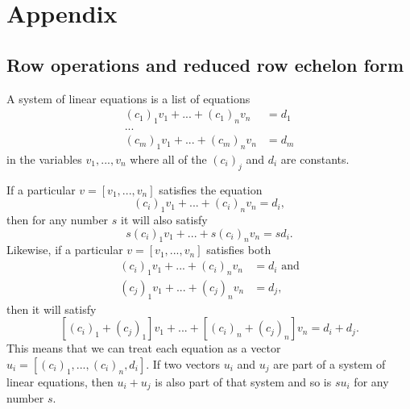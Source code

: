 \section{Appendix}
\subsection{Row operations and reduced row echelon form}
\label{reduced row echelon}
A system of linear equations is a list of equations
\begin{align*}
	(c_1)_1v_1+...+(c_1)_nv_n&=d_1\\
	...&\\
	(c_m)_1v_1+...+(c_m)_nv_n&=d_m
\end{align*}
in the variables $v_1,...,v_n$ where all of the $(c_i)_j$ and $d_i$ are constants.

If a particular $v=[v_1,...,v_n]$ satisfies the equation
$$(c_i)_1v_1+...+(c_i)_nv_n=d_i,$$
then for any number $s$ it will also satisfy
$$s(c_i)_1v_1+...+s(c_i)_nv_n=sd_i.$$
Likewise, if a particular $v=[v_1,...,v_n]$ satisfies both
\begin{align*}
	(c_i)_1v_1+...+(c_i)_nv_n&=d_i\text{ and}\\
	(c_j)_1v_1+...+(c_j)_nv_n&=d_j,
\end{align*}
then it will satisfy
$$\left[(c_i)_1+(c_j)_1\right]v_1+...+\left[(c_i)_n+(c_j)_n\right]v_n=d_i+d_j.$$
This means that we can treat each equation as a vector $u_i=[(c_i)_1,...,(c_i)_n,d_i]$. If two vectors $u_i$ and $u_j$ are part of a system of linear equations, then $u_i+u_j$ is also part of that system and so is $su_i$ for any number $s$.

